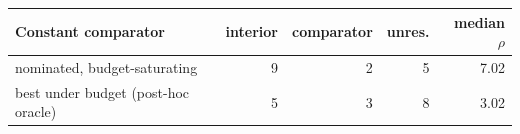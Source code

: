 \begin{tabular}{@{}l r r r r@{}}
\toprule
Constant comparator & interior & comparator & unres. & median $\rho$ \\
\midrule
nominated, budget-saturating & 9 & 2 & 5 & 7.02 \\
best under budget (post-hoc oracle) & 5 & 3 & 8 & 3.02 \\
\bottomrule
\end{tabular}

